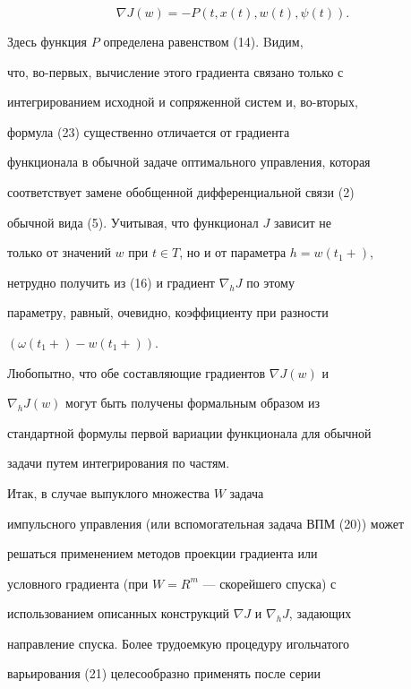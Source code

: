 \begin{equation}


\nabla J(w) = -P(t,x(t),w(t),\psi(t)).


\end{equation}


Здесь функция $P$ определена равенством (14). Bидим,


что, во-первых, вычисление этого градиента связано только с


интегрированием исходной и сопряженной систем и, во-вторых,


формула (23) существенно отличается от градиента 


функционала в обычной задаче оптимального управления, которая 


соответствует замене обобщенной дифференциальной связи (2)


обычной вида (5). Учитывая, что функционал $J$ зависит не


только от значений $w$ при $t\in T$, но и от параметра $h=w(t_1+)$,


нетрудно получить из (16) и градиент $\nabla_hJ$ по этому 


параметру, равный, очевидно, коэффициенту при разности


$(\omega(t_1+)-w(t_1+))$.





Любопытно, что обе составляющие градиентов $\nabla J(w)$ и


$\nabla_hJ(w)$ могут быть получены формальным образом из 


стандартной формулы первой вариации функционала для обычной


задачи путем интегрирования по частям.


 


Итак, в случае выпуклого множества $W$ задача 


импульсного управления (или вспомогательная задача ВПМ (20)) может


решаться применением методов проекции градиента или 


условного градиента (при $W=R^m$ --- скорейшего спуска) с 


использованием описанных конструкций $\nabla J$ и $\nabla_hJ$, задающих 


направление спуска. Более трудоемкую процедуру игольчатого


варьирования (21) целесообразно применять после серии


